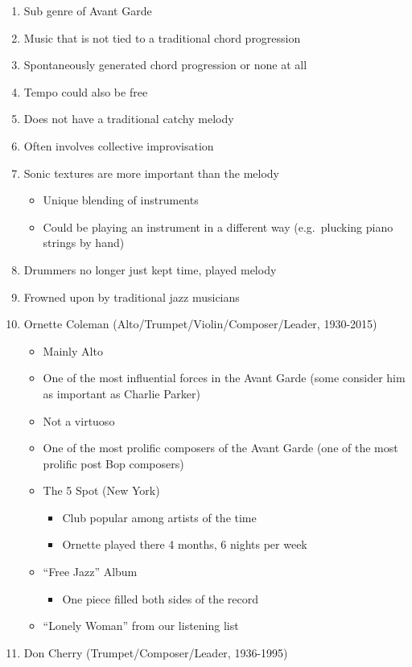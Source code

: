 \documentclass[]{article}
\providecommand{\tightlist}{%
  \setlength{\itemsep}{0pt}\setlength{\parskip}{0pt}}
\begin{document}
\begin{enumerate}
\def\labelenumi{\arabic{enumi}.}
\tightlist
\item
  Sub genre of Avant Garde
\item
  Music that is not tied to a traditional chord progression
\item
  Spontaneously generated chord progression or none at all
\item
  Tempo could also be free
\item
  Does not have a traditional catchy melody
\item
  Often involves collective improvisation
\item
  Sonic textures are more important than the melody

  \begin{itemize}
  \tightlist
  \item
    Unique blending of instruments
  \item
    Could be playing an instrument in a different way (e.g.~plucking
    piano strings by hand)
  \end{itemize}
\item
  Drummers no longer just kept time, played melody
\item
  Frowned upon by traditional jazz musicians
\item
  Ornette Coleman (Alto/Trumpet/Violin/Composer/Leader, 1930-2015)

  \begin{itemize}
  \tightlist
  \item
    Mainly Alto
  \item
    One of the most influential forces in the Avant Garde (some consider
    him as important as Charlie Parker)
  \item
    Not a virtuoso
  \item
    One of the most prolific composers of the Avant Garde (one of the
    most prolific post Bop composers)
  \item
    The 5 Spot (New York)

    \begin{itemize}
    \tightlist
    \item
      Club popular among artists of the time
    \item
      Ornette played there 4 months, 6 nights per week
    \end{itemize}
  \item
    ``Free Jazz'' Album

    \begin{itemize}
    \tightlist
    \item
      One piece filled both sides of the record
    \end{itemize}
  \item
    ``Lonely Woman'' from our listening list
  \end{itemize}
\item
  Don Cherry (Trumpet/Composer/Leader, 1936-1995)


\end{enumerate}
\end{document}
